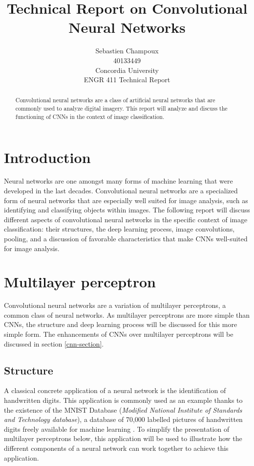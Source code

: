 \documentclass[12pt,a4paper,notitlepage]{article}
\begin{document}
\title{Technical Report on Convolutional Neural Networks}
\author{Sebastien Champoux
\\ 40133449
\\ Concordia University
\\ ENGR 411 Technical Report
}
\maketitle

\begin{abstract}
Convolutional neural networks are a class of artificial neural networks that are commonly used to analyze digital imagery. This report will analyze and discuss the functioning of CNNs in the context of image classification.
\end{abstract}
\clearpage

\tableofcontents
\clearpage

\listoffigures
\clearpage

\section{Introduction}
Neural networks are one amongst many forms of machine learning that were developed in the last decades. Convolutional neural networks are a specialized form of neural networks that are especially well suited for image analysis, such as identifying and classifying objects within images. The following report will discuss different aspects of convolutional neural networks  in the specific context of image classification: their structures, the deep learning process, image convolutions, pooling, and a discussion of favorable characteristics that make CNNs well-suited for image analysis.

\section{Multilayer perceptron}\label{multilayer-perceptron}
Convolutional neural networks are a variation of multilayer perceptrons, a common class of neural networks. As multilayer perceptrons are more simple than CNNs, the structure and deep learning process will be discussed for this more simple form. The enhancements of CNNs over multilayer perceptrons will be discussed in section \ref{cnn-section}.

\subsection{Structure}
A classical concrete application of a neural network is the identification of handwritten digits. This application is commonly used as an example thanks to the existence of the MNIST Database (\textit{Modified National Institute of Standards and Technology database}), a database of 70,000 labelled pictures of handwritten digits freely available for machine learning \cite{lecun_mnist_1998}. To simplify the presentation of multilayer perceptrons below, this application will be used to illustrate how the different components of a neural network can work together to achieve this application.
\end{document}
